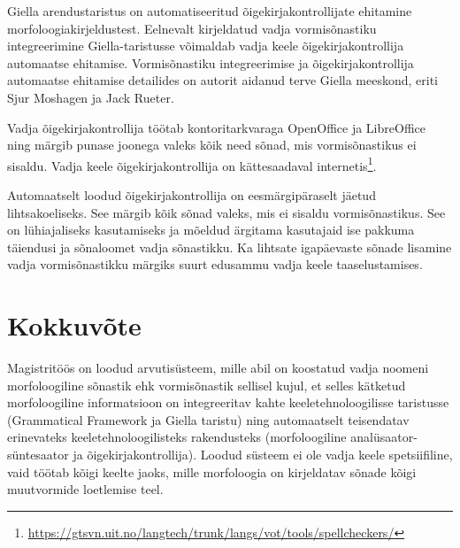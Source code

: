 \documentclass[12pt,a4paper]{article}
\begin{document}
Giella arendus\-taristus on automatiseeritud õige\-kirja\-kontrollijate ehitamine morfoloogia\-kirjeldustest. Eelnevalt kirjeldatud vadja vormisõnastiku integreerimine Giella-taristusse võimaldab vadja keele õige\-kirja\-kontrollija automaatse ehitamise. Vormisõnastiku integreerimise ja õigekirjakontrollija automaatse ehitamise detailides on autorit aidanud terve Giella meeskond, eriti Sjur Moshagen ja Jack Rueter.

Vadja õige\-kirja\-kontrollija töötab kontori\-tarkvaraga OpenOffice ja LibreOffice ning märgib punase joonega valeks kõik need sõnad, mis vormi\-sõnastikus ei sisaldu. Vadja keele õige\-kirja\-kontrollija on kätte\-saadaval internetis\footnote{\url{https://gtsvn.uit.no/langtech/trunk/langs/vot/tools/spellcheckers/}}. 


Automaatselt loodud õige\-kirja\-kontrollija on eesmärgi\-päraselt jäetud lihtsa\-koeliseks. See märgib kõik sõnad valeks, mis ei sisaldu vormi\-sõnastikus. See on lühi\-ajaliseks kasutamiseks ja mõeldud ärgitama kasutajaid ise pakkuma täiendusi ja sõnaloomet vadja sõnastikku. Ka lihtsate igapäevaste sõnade lisamine vadja vormi\-sõnastikku märgiks suurt edu\-sammu vadja keele taas\-elustamises.






\newpage
\section{Kokkuvõte}
\label{sec:kokkuvõte}

Magistritöös on loodud arvutisüsteem, mille abil on koostatud vadja noomeni morfoloogiline sõnastik ehk vormisõnastik sellisel kujul, et selles kätketud morfoloogiline informatsioon on integreeritav kahte keeletehnoloogilisse taristusse (Grammatical Framework ja Giella taristu) ning automaatselt teisendatav erinevateks keele\-tehnoloogilisteks rakendusteks (morfoloogiline analüsaator-süntesaator ja õige\-kirja\-kontrollija). Loodud süsteem ei ole vadja keele spetsiifiline, vaid töötab kõigi keelte jaoks, mille morfoloogia on kirjeldatav sõnade kõigi muutvormide loetlemise teel. %
\end{document}
